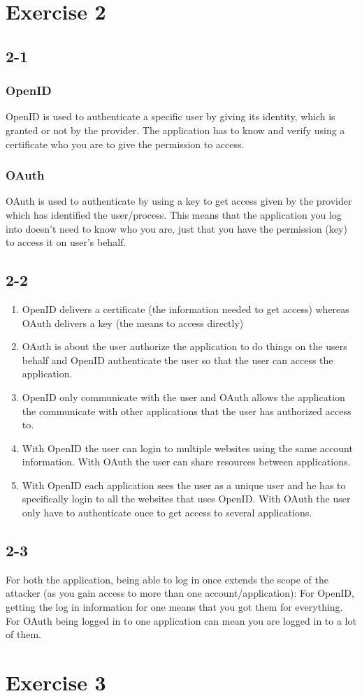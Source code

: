 \documentclass[12pt]{article}
\begin{document}
\section*{Exercise 2}
\subsection*{2-1}
\subsubsection*{OpenID}
OpenID is used to authenticate a specific user by giving its identity, which is granted or not by the provider. The application has to know and verify using a certificate who you are to give the permission to access.

\subsubsection*{OAuth}
OAuth is used to authenticate by using a key to get access given by the provider which has identified the user/process. This means that the application you log into doesn't need to know who you are, just that you have the permission (key) to access it on user's behalf.

\subsection*{2-2}
\begin{enumerate}
\item OpenID delivers a certificate (the information needed to get access) whereas OAuth delivers a key (the means to access directly)
\item OAuth is about the user authorize the application to do things on the users behalf and OpenID authenticate the user so that the user can access the application.
\item OpenID only communicate with the user and OAuth allows the application the communicate with other applications that the user has authorized access to. 
\item With OpenID the user can login to multiple websites using the same account information. With OAuth the user can share resources between applications.
\item With OpenID each application sees the user as a unique user and he has to specifically login to all the websites that uses OpenID. With OAuth the user only have to authenticate once to get access to several applications. 
\end{enumerate}

\subsection*{2-3}
For both the application, being able to log in once extends the scope of the attacker (as you gain access to more than one account/application): For OpenID, getting the log in information for one means that you got them for everything. For OAuth being logged in to one application can mean you are logged in to a lot of them.

\section*{Exercise 3}
\end{document}
